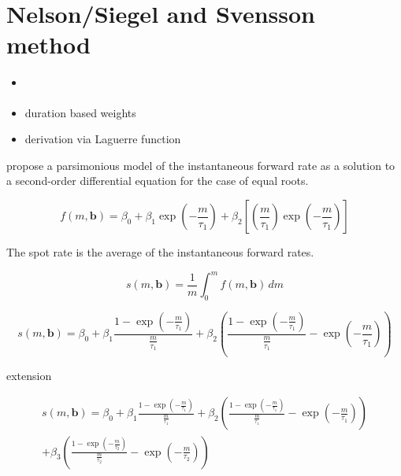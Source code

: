 
\section{Nelson/Siegel and Svensson method}
\label{sec:nels-svenss-meth}


\begin{itemize}
\item \cite{Geyer1999}
\item duration based weights \cite{Bliss1997}
\item derivation via Laguerre function
\end{itemize}


\cite{Nelson1987} propose a parsimonious  model of  the instantaneous forward rate as a solution to a second-order differential equation for the case of equal roots.

\begin{equation}
  \label{eq:laguerre}
  f(m,\bm{b}) = \beta_0+\beta_1\exp\left(-\frac{m}{\tau_1}\right)+\beta_2\left[\left(\frac{m}{\tau_1}\right)\exp\left(-\frac{m}{\tau_1}\right)\right]
\end{equation}


The spot rate is the average of the instantaneous forward rates. 

\begin{equation}
  \label{eq:intspotrate}
  s(m,\bm{b})=\frac{1}{m}\int_0^mf(m,\bm{b})\,dm
\end{equation}


\begin{equation}
  \label{eq:nelson-spot}
   s(m,\bm{b}) = \beta_0 + \beta_1\frac{1-\exp(-\frac{m}{\tau_1})}{\frac{m}{\tau_1}} + \beta_2\left(\frac{1-\exp(-\frac{m}{\tau_1})}{\frac{m}{\tau_1}} - \exp(-\frac{m}{\tau_1})\right)
\end{equation}



%
 
\cite{Svensson1994} extension


\begin{multline}\label{eq:svensson-spot}
    s(m,\bm{b}) = \beta_0 + \beta_1\frac{1-\exp(-\frac{m}{\tau_1})}{\frac{m}{\tau_1}} + \beta_2\left(\frac{1-\exp(-\frac{m}{\tau_1})}{\frac{m}{\tau_1}} - \exp(-\frac{m}{\tau_1})\right) \\+ \beta_3\left(\frac{1-\exp(-\frac{m}{\tau_2})}{\frac{m}{\tau_2}} - \exp(-\frac{m}{\tau_2})\right)
\end{multline}



